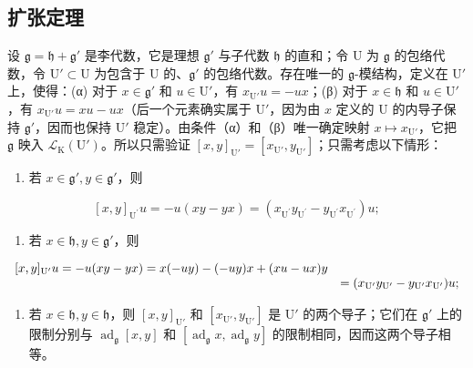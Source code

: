 \subsection{扩张定理}

设 \(\mathfrak{g} = \mathfrak{h} + \mathfrak{g}'\) 是李代数，它是理想 \(\mathfrak{g}'\) 与子代数 \(\mathfrak{h}\) 的直和；令 U 为 \(\mathfrak{g}\) 的包络代数，令 \(\mathrm{U}' \subset \mathrm{U}\) 为包含于 U 的、\(\mathfrak{g}'\) 的包络代数。存在唯一的 \(\mathfrak{g}\)-模结构，定义在 \(\mathrm{U}'\) 上，使得：(α) 对于 \(x \in \mathfrak{g}'\) 和 \(u \in \mathrm{U}'\)，有 \(x_{\mathrm{U}'}u = -ux\)；(β) 对于 \(x \in \mathfrak{h}\) 和 \(u \in \mathrm{U}'\)，有 \(x_{\mathrm{U}'}u = xu - ux\)（后一个元素确实属于 \(\mathrm{U}'\)，因为由 \(x\) 定义的 U 的内导子保持 \(\mathfrak{g}'\)，因而也保持 \(\mathrm{U}'\) 稳定）。由条件（α）和（β）唯一确定映射 \(x \mapsto x_{\mathrm{U}'}\)，它把 \(\mathfrak{g}\) 映入 \(\mathcal{L}_{\mathrm{K}}(\mathrm{U}')\)。所以只需验证 \([x, y]_{\mathrm{U}'} = [x_{\mathrm{U}'}, y_{\mathrm{U}'}]\)；只需考虑以下情形：

\begin{enumerate}
\def\labelenumi{(\arabic{enumi})}
\tightlist
\item
  若 \(x \in \mathfrak{g}', y \in \mathfrak{g}'\)，则
\end{enumerate}

\[
[ x, y ] _ {\mathrm{U} ^ {\prime}} u = - u (x y - y x) = \left(x _ {\mathrm{U} ^ {\prime}} y _ {\mathrm{U} ^ {\prime}} - y _ {\mathrm{U} ^ {\prime}} x _ {\mathrm{U} ^ {\prime}}\right) u;
\]

\begin{enumerate}
\def\labelenumi{(\arabic{enumi})}
\setcounter{enumi}{1}
\tightlist
\item
  若 \(x \in \mathfrak{h}, y \in \mathfrak{g}'\)，则
\end{enumerate}

\[
\begin{array}{r l} {[ x, y ] _ {\mathrm{U}'} u = - u (x y - y x) = x (- u y) - (- u y) x + (x u - u x) y} \\ & {= (x _ {\mathrm{U}'} y _ {\mathrm{U}'} - y _ {\mathrm{U}'} x _ {\mathrm{U}'}) u;} \end{array}
\]

\begin{enumerate}
\def\labelenumi{(\arabic{enumi})}
\setcounter{enumi}{2}
\tightlist
\item
  若 \(x \in \mathfrak{h}, y \in \mathfrak{h}\)，则 \([x, y]_{\mathrm{U}'}\) 和 \([x_{\mathrm{U}'}, y_{\mathrm{U}'}]\) 是 \(\mathrm{U}'\) 的两个导子；它们在 \(\mathfrak{g}'\) 上的限制分别与 \(\operatorname{ad}_{\mathfrak{g}}[x, y]\) 和 \([\operatorname{ad}_{\mathfrak{g}}x, \operatorname{ad}_{\mathfrak{g}}y]\) 的限制相同，因而这两个导子相等。
\end{enumerate}

